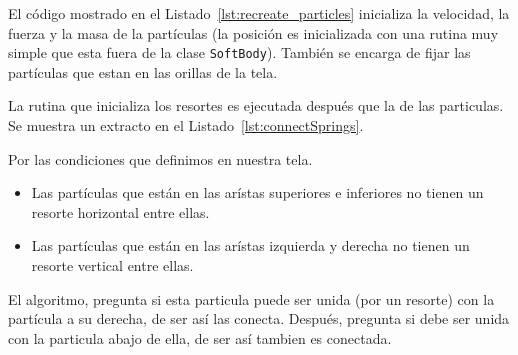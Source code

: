 

El código mostrado en el Listado~\ref{lst:recreate_particles} inicializa la velocidad, la fuerza y la masa de la partículas (la posición es inicializada con una rutina muy simple que esta fuera de la clase \texttt{SoftBody}). También se encarga de fijar las partículas que estan en las orillas de la tela.

La rutina que inicializa los resortes es ejecutada después que la de las particulas. Se muestra un extracto en el Listado~\ref{lst:connectSprings}.


Por las condiciones que definimos en nuestra tela. 
\begin{itemize}
 \item Las partículas que están en las arístas superiores e inferiores no tienen un resorte horizontal entre ellas.
 \item Las partículas que están en las arístas izquierda y derecha no tienen un resorte vertical entre ellas.
\end{itemize} 

El algoritmo, pregunta si esta particula puede ser unida (por un resorte) con la partícula a su derecha, de ser así las conecta. Después, pregunta si debe ser unida con la particula abajo de ella, de ser así tambien es conectada.

